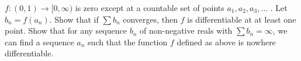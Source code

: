 \(f\colon  (0,1) \to [0, \infty)\) is zero except at a countable set of points \(a_{1}, a_2, a_3, \dots \) . Let \(b_n = f(a_n)\). Show that if \(\sum b_{n}\) converges, then \(f\) is differentiable at at least one point. Show that for any sequence \(b_{n}\) of non-negative reals with  \(\sum b_{n} =\infty\), we can find a sequence \(a_{n}\) such that the function \(f\) defined as above is nowhere differentiable.